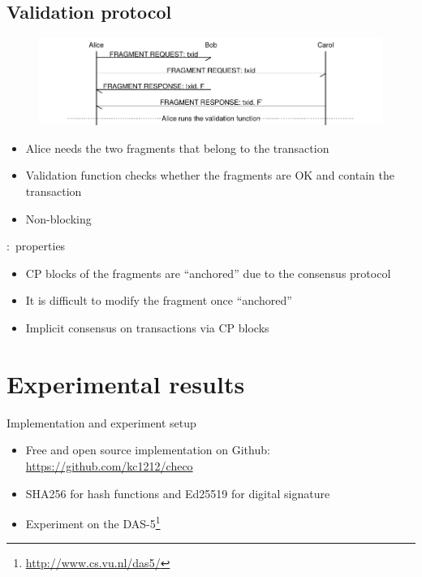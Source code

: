 \documentclass{beamer}
\begin{document}
\subsection{Validation protocol}
\begin{frame}{\subsecname}
  \begin{figure}[h]
  \includegraphics[width=1.0\textwidth]{vd-proto}
  \centering
  \end{figure}
\begin{itemize}
\item Alice needs the two fragments that belong to the transaction
\item Validation function checks whether the fragments are OK and contain the transaction
\item Non-blocking
\end{itemize}
\end{frame}

\begin{frame}{\subsecname:~properties}
\begin{itemize}
  \item CP blocks of the fragments are ``anchored'' due to the consensus protocol
  \item It is difficult to modify the fragment once ``anchored''
  \item Implicit consensus on transactions via CP blocks
\end{itemize}
\end{frame}

\section{Experimental results}
\begin{frame}{Implementation and experiment setup}
  \begin{itemize}
    \item Free and open source implementation on Github:
      \url{https://github.com/kc1212/checo}
    \item SHA256 for hash functions and Ed25519 for digital signature
    \item Experiment on the DAS-5\footnote{\url{http://www.cs.vu.nl/das5/}}
  \end{itemize}
\end{frame}
\end{document}
